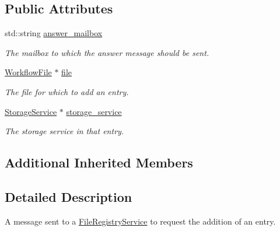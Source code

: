 \subsection*{Public Attributes}
\begin{DoxyCompactItemize}
\item 
\mbox{\label{classwrench_1_1_file_registry_add_entry_request_message_ad5f93da91104c2d9ce91ae6c1bc12cb6}} 
std\+::string \hyperlink{classwrench_1_1_file_registry_add_entry_request_message_ad5f93da91104c2d9ce91ae6c1bc12cb6}{answer\+\_\+mailbox}
\begin{DoxyCompactList}\small\item\em The mailbox to which the answer message should be sent. \end{DoxyCompactList}\item 
\mbox{\label{classwrench_1_1_file_registry_add_entry_request_message_a852df55c4319cd183e92e68590fc6975}} 
\hyperlink{classwrench_1_1_workflow_file}{Workflow\+File} $\ast$ \hyperlink{classwrench_1_1_file_registry_add_entry_request_message_a852df55c4319cd183e92e68590fc6975}{file}
\begin{DoxyCompactList}\small\item\em The file for which to add an entry. \end{DoxyCompactList}\item 
\mbox{\label{classwrench_1_1_file_registry_add_entry_request_message_a97af80a03ee957c5961c3f40b9da42a5}} 
\hyperlink{classwrench_1_1_storage_service}{Storage\+Service} $\ast$ \hyperlink{classwrench_1_1_file_registry_add_entry_request_message_a97af80a03ee957c5961c3f40b9da42a5}{storage\+\_\+service}
\begin{DoxyCompactList}\small\item\em The storage service in that entry. \end{DoxyCompactList}\end{DoxyCompactItemize}
\subsection*{Additional Inherited Members}


\subsection{Detailed Description}
A message sent to a \hyperlink{classwrench_1_1_file_registry_service}{File\+Registry\+Service} to request the addition of an entry. 

